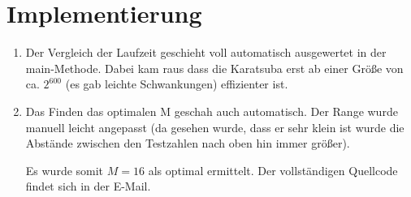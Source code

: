 \documentclass[a4paper,10pt]{scrartcl}
\begin{document}
\section{Implementierung}
\begin{enumerate}
\item  

        
      
        

Der Vergleich der Laufzeit geschieht voll automatisch ausgewertet in der main-Methode.
Dabei kam raus dass die Karatsuba erst ab einer Größe von ca. $2^{600}$ (es gab leichte Schwankungen) effizienter ist.

 

\item
       
  Das Finden das optimalen M geschah auch automatisch. Der Range wurde manuell leicht angepasst (da gesehen wurde, dass er sehr klein ist wurde die Abstände zwischen den Testzahlen nach oben hin immer größer).

Es wurde somit $M = 16$ als optimal ermittelt.
Der vollständigen Quellcode findet sich in der E-Mail.

\end{enumerate}
\end{document}
